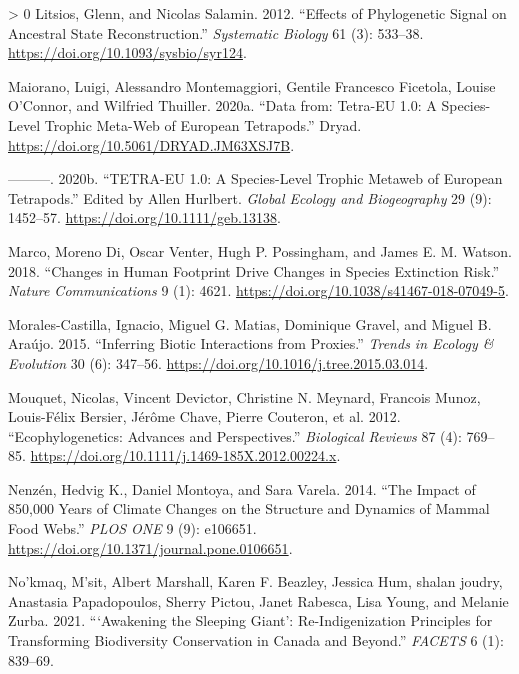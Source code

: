 \documentclass[11pt]{article}
\newlength{\cslhangindent}
\newenvironment{CSLReferences}[3] %
 {%
  \setlength{\parindent}{0pt}
  \ifodd #1 \everypar{\setlength{\hangindent}{\cslhangindent}}\ignorespaces\fi
  \ifnum #2 > 0
  \setlength{\parskip}{#2\baselineskip}
  \fi
 }%
 {}
\begin{document}
\begin{CSLReferences}{1}{0}
\leavevmode\hypertarget{ref-Litsios2012EffPhy}{}%
Litsios, Glenn, and Nicolas Salamin. 2012. {``Effects of Phylogenetic
Signal on Ancestral State Reconstruction.''} \emph{Systematic Biology}
61 (3): 533--38. \url{https://doi.org/10.1093/sysbio/syr124}.

\leavevmode\hypertarget{ref-Maiorano2020DatTet}{}%
Maiorano, Luigi, Alessandro Montemaggiori, Gentile Francesco Ficetola,
Louise O'Connor, and Wilfried Thuiller. 2020a. {``Data from: Tetra-EU
1.0: A Species-Level Trophic Meta-Web of European Tetrapods.''} Dryad.
\url{https://doi.org/10.5061/DRYAD.JM63XSJ7B}.

\leavevmode\hypertarget{ref-Maiorano2020TetEu}{}%
---------. 2020b. {``TETRA-EU 1.0: A Species-Level Trophic Metaweb of
European Tetrapods.''} Edited by Allen Hurlbert. \emph{Global Ecology
and Biogeography} 29 (9): 1452--57.
\url{https://doi.org/10.1111/geb.13138}.

\leavevmode\hypertarget{ref-Marco2018ChaHum}{}%
Marco, Moreno Di, Oscar Venter, Hugh P. Possingham, and James E. M.
Watson. 2018. {``Changes in Human Footprint Drive Changes in Species
Extinction Risk.''} \emph{Nature Communications} 9 (1): 4621.
\url{https://doi.org/10.1038/s41467-018-07049-5}.

\leavevmode\hypertarget{ref-Morales-Castilla2015InfBio}{}%
Morales-Castilla, Ignacio, Miguel G. Matias, Dominique Gravel, and
Miguel B. Araújo. 2015. {``Inferring Biotic Interactions from
Proxies.''} \emph{Trends in Ecology \& Evolution} 30 (6): 347--56.
\url{https://doi.org/10.1016/j.tree.2015.03.014}.

\leavevmode\hypertarget{ref-Mouquet2012EcoAdv}{}%
Mouquet, Nicolas, Vincent Devictor, Christine N. Meynard, Francois
Munoz, Louis-Félix Bersier, Jérôme Chave, Pierre Couteron, et al. 2012.
{``Ecophylogenetics: Advances and Perspectives.''} \emph{Biological
Reviews} 87 (4): 769--85.
\url{https://doi.org/10.1111/j.1469-185X.2012.00224.x}.

\leavevmode\hypertarget{ref-Nenzen2014Imp850}{}%
Nenzén, Hedvig K., Daniel Montoya, and Sara Varela. 2014. {``The Impact
of 850,000 Years of Climate Changes on the Structure and Dynamics of
Mammal Food Webs.''} \emph{PLOS ONE} 9 (9): e106651.
\url{https://doi.org/10.1371/journal.pone.0106651}.

\leavevmode\hypertarget{ref-Nokmaq2021AwaSle}{}%
No'kmaq, M'sit, Albert Marshall, Karen F. Beazley, Jessica Hum, shalan
joudry, Anastasia Papadopoulos, Sherry Pictou, Janet Rabesca, Lisa
Young, and Melanie Zurba. 2021. {``{`Awakening the Sleeping Giant'}:
Re-Indigenization Principles for Transforming Biodiversity Conservation
in Canada and Beyond.''} \emph{FACETS} 6 (1): 839--69.


\end{CSLReferences}
\end{document}
